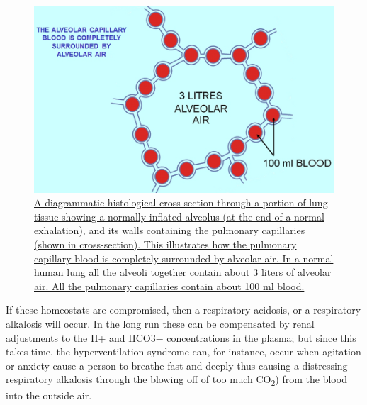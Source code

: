 \begin{figure}

{\centering \includegraphics[width=0.7\linewidth]{./figures/respiratory/Alveolus} 

}

\caption{\href{https://commons.wikimedia.org/wiki/File:Alveolus.jpg}{A diagrammatic histological cross-section through a portion of lung tissue showing a normally inflated alveolus (at the end of a normal exhalation), and its walls containing the pulmonary capillaries (shown in cross-section). This illustrates how the pulmonary capillary blood is completely surrounded by alveolar air. In a normal human lung all the alveoli together contain about 3 liters of alveolar air. All the pulmonary capillaries contain about 100 ml blood.}}\label{fig:alveolarair}
\end{figure}

If these homeostats are compromised, then a respiratory acidosis, or a respiratory alkalosis will occur. In the long run these can be compensated by renal adjustments to the H+ and HCO3− concentrations in the plasma; but since this takes time, the hyperventilation syndrome can, for instance, occur when agitation or anxiety cause a person to breathe fast and deeply thus causing a distressing respiratory alkalosis through the blowing off of too much CO\textsubscript{2}) from the blood into the outside air.

